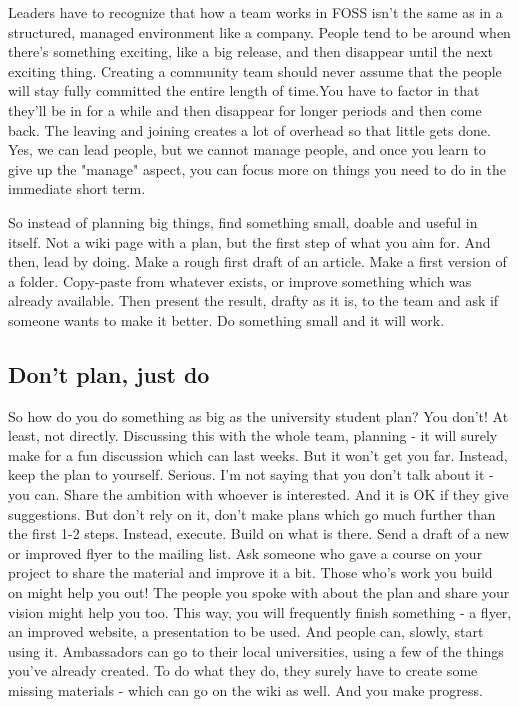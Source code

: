 Leaders have to recognize that how a team works in FOSS isn't the same as in a structured, managed environment like a company. People tend to be around when there's something exciting, like a big release, and then disappear until the next exciting thing. Creating a community team should never assume that the people will stay fully committed the entire length of time.You have to factor in that they'll be in for a while and then disappear for longer periods and then come back. The leaving and joining creates a lot of overhead so that little gets done. Yes, we can lead people, but we cannot manage people, and once you learn to give up the "manage" aspect, you can focus more on things you need to do in the immediate short term.

So instead of planning big things, find something small, doable and useful in itself. Not a wiki page with a plan, but the first step of what you aim for. And then, lead by doing. Make a rough first draft of an article. Make a first version of a folder. Copy-paste from whatever exists, or improve something which was already available. Then present the result, drafty as it is, to the team and ask if someone wants to make it better. Do something small and it will work.

\subsection*{Don't plan, just do}
So how do you do something as big as the university student plan? You don't! At least, not directly. Discussing this with the whole team, planning - it will surely make for a fun discussion which can last weeks. But it won't get you far. Instead, keep the plan to yourself. Serious. I'm not saying that you don't talk about it - you can. Share the ambition with whoever is interested. And it is OK if they give suggestions. But don't rely on it, don't make plans which go much further than the first 1-2 steps. Instead, execute. Build on what is there. Send a draft of a new or improved flyer to the mailing list. Ask someone who gave a course on your project to share the material and improve it a bit. Those who's work you build on might help you out! The people you spoke with about the plan and share your vision might help you too. This way, you will frequently finish something - a flyer, an improved website, a presentation to be used. And people can, slowly, start using it. Ambassadors can go to their local universities, using a few of the things you've already created. To do what they do, they surely have to create some missing materials - which can go on the wiki as well. And you make progress.

